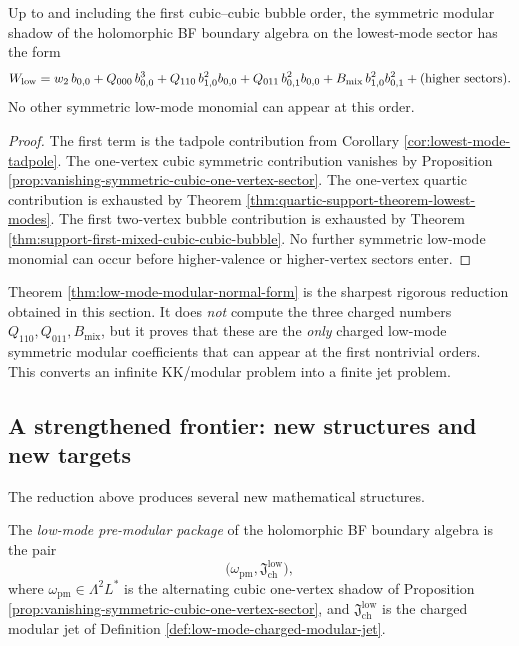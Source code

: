 \begin{theorem}
Up to and including the first cubic--cubic bubble order, the symmetric modular shadow of the
holomorphic BF boundary algebra on the lowest-mode sector has the form
\begin{equation}
W_{\mathrm{low}}
=
w_2\,b_{0,0}
+
Q_{000}\,b_{0,0}^3
+
Q_{110}\,b_{1,0}^2b_{0,0}
+
Q_{011}\,b_{0,1}^2b_{0,0}
+
B_{\mathrm{mix}}\,b_{1,0}^2b_{0,1}^2
+
\textup{(higher sectors)}.
\end{equation}
No other symmetric low-mode monomial can appear at this order.
\end{theorem}

\begin{proof}
The first term is the tadpole contribution from Corollary
\ref{cor:lowest-mode-tadpole}. The one-vertex cubic symmetric contribution vanishes by
Proposition \ref{prop:vanishing-symmetric-cubic-one-vertex-sector}. The one-vertex quartic
contribution is exhausted by Theorem \ref{thm:quartic-support-theorem-lowest-modes}. The
first two-vertex bubble contribution is exhausted by Theorem
\ref{thm:support-first-mixed-cubic-cubic-bubble}. No further symmetric low-mode monomial can
occur before higher-valence or higher-vertex sectors enter.
\end{proof}

\begin{remark}
Theorem \ref{thm:low-mode-modular-normal-form} is the sharpest rigorous reduction obtained
in this section. It does \emph{not} compute the three charged numbers
$Q_{110},Q_{011},B_{\mathrm{mix}}$, but it proves that these are the \emph{only} charged low-mode
symmetric modular coefficients that can appear at the first nontrivial orders. This converts an
infinite KK/modular problem into a finite jet problem.
\end{remark}

\subsection{A strengthened frontier: new structures and new targets}

The reduction above produces several new mathematical structures.

\begin{definition}
The \emph{low-mode pre-modular package} of the holomorphic BF boundary algebra is the pair
\[
\bigl(\omega_{\mathrm{pm}},\mathfrak J_{\mathrm{ch}}^{\mathrm{low}}\bigr),
\]
where $\omega_{\mathrm{pm}}\in \Lambda^2L^*$ is the alternating cubic one-vertex shadow of
Proposition \ref{prop:vanishing-symmetric-cubic-one-vertex-sector}, and
$\mathfrak J_{\mathrm{ch}}^{\mathrm{low}}$ is the charged modular jet of Definition
\ref{def:low-mode-charged-modular-jet}.
\end{definition}

